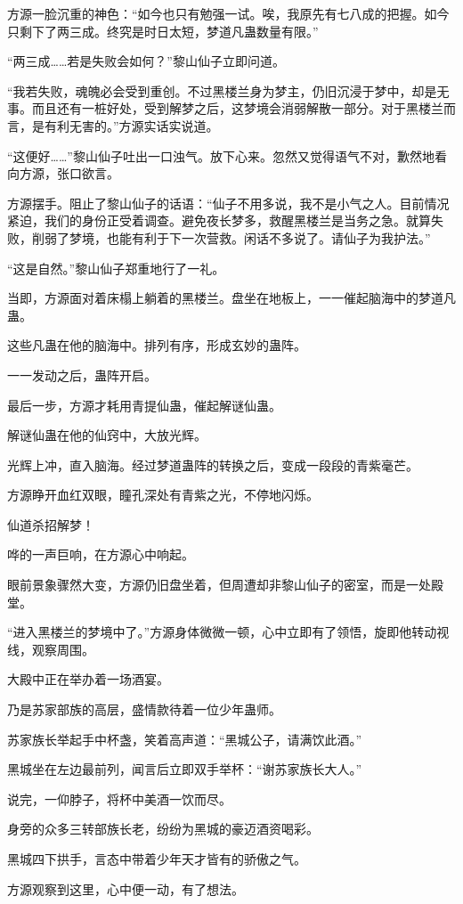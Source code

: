 \begin{this_body}
方源一脸沉重的神色：“如今也只有勉强一试。唉，我原先有七八成的把握。如今只剩下了两三成。终究是时日太短，梦道凡蛊数量有限。”

“两三成……若是失败会如何？”黎山仙子立即问道。

“我若失败，魂魄必会受到重创。不过黑楼兰身为梦主，仍旧沉浸于梦中，却是无事。而且还有一桩好处，受到解梦之后，这梦境会消弱解散一部分。对于黑楼兰而言，是有利无害的。”方源实话实说道。

“这便好……”黎山仙子吐出一口浊气。放下心来。忽然又觉得语气不对，歉然地看向方源，张口欲言。

方源摆手。阻止了黎山仙子的话语：“仙子不用多说，我不是小气之人。目前情况紧迫，我们的身份正受着调查。避免夜长梦多，救醒黑楼兰是当务之急。就算失败，削弱了梦境，也能有利于下一次营救。闲话不多说了。请仙子为我护法。”

“这是自然。”黎山仙子郑重地行了一礼。

当即，方源面对着床榻上躺着的黑楼兰。盘坐在地板上，一一催起脑海中的梦道凡蛊。

这些凡蛊在他的脑海中。排列有序，形成玄妙的蛊阵。

一一发动之后，蛊阵开启。

最后一步，方源才耗用青提仙蛊，催起解谜仙蛊。

解谜仙蛊在他的仙窍中，大放光辉。

光辉上冲，直入脑海。经过梦道蛊阵的转换之后，变成一段段的青紫毫芒。

方源睁开血红双眼，瞳孔深处有青紫之光，不停地闪烁。

仙道杀招解梦！

哗的一声巨响，在方源心中响起。

眼前景象骤然大变，方源仍旧盘坐着，但周遭却非黎山仙子的密室，而是一处殿堂。

“进入黑楼兰的梦境中了。”方源身体微微一顿，心中立即有了领悟，旋即他转动视线，观察周围。

大殿中正在举办着一场酒宴。

乃是苏家部族的高层，盛情款待着一位少年蛊师。

苏家族长举起手中杯盏，笑着高声道：“黑城公子，请满饮此酒。”

黑城坐在左边最前列，闻言后立即双手举杯：“谢苏家族长大人。”

说完，一仰脖子，将杯中美酒一饮而尽。

身旁的众多三转部族长老，纷纷为黑城的豪迈酒资喝彩。

黑城四下拱手，言态中带着少年天才皆有的骄傲之气。

方源观察到这里，心中便一动，有了想法。


\end{this_body}
